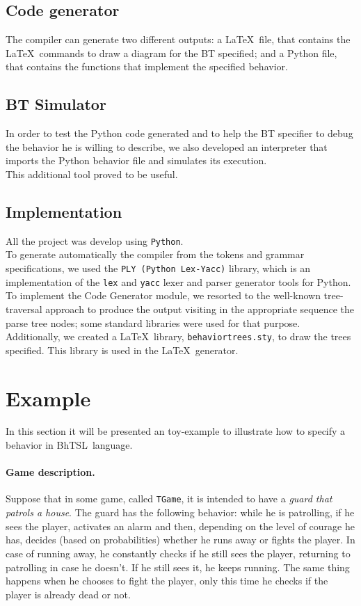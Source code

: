 \documentclass[a4paper,UKenglish,cleveref, autoref, thm-restate]{oasics-v2019}
\def\bht{BhTSL}
\begin{document}
\subsection{Code generator}
The compiler can generate two different outputs: 
a \LaTeX\ file, that contains the \LaTeX\ commands to draw a diagram for the BT specified; 
and a Python file, that contains the functions that implement the specified behavior.

\subsection{BT Simulator}
In order to test the Python code generated and to help the BT specifier to debug the behavior he is willing
to describe, we also developed an interpreter that imports the Python behavior file and simulates its
execution.\\
This additional tool proved to be useful.

\subsection{Implementation}
All the project was develop using \texttt{Python}.\\
To generate automatically  the compiler  from the tokens and grammar specifications, 
we used the \texttt{PLY (Python Lex-Yacc)} library, which is an implementation of the 
\texttt{lex} and \texttt{yacc} lexer and parser generator tools for Python.\\
To  implement the Code Generator module, we resorted to the well-known tree-traversal approach
to produce the output visiting in the appropriate sequence the parse tree nodes;
 some standard libraries were used for that purpose.\\
Additionally, we created a \LaTeX\ library, \texttt{behaviortrees.sty}, to draw the trees specified. 
This library is used in the \LaTeX\ generator.

\section{Example}
\label{sec:example}
In this section it will be presented an toy-example to illustrate how to specify a behavior in \bht\ language.

\paragraph{Game description.} Suppose that in some game, called \texttt{TGame}, 
it is intended  to have a \emph{guard that patrols a house}.
The guard has the following behavior: while he is patrolling, if he sees the player, activates an alarm and then, 
depending on the level of courage he has, decides (based on probabilities) whether he runs away or fights the player.
In case of running away, he constantly checks if he still sees the player, returning to patrolling in case he doesn't. 
If he still sees it, he keeps running.
The same thing happens when he chooses to fight the player, only this time he checks if the player is already dead 
or not.
\end{document}
